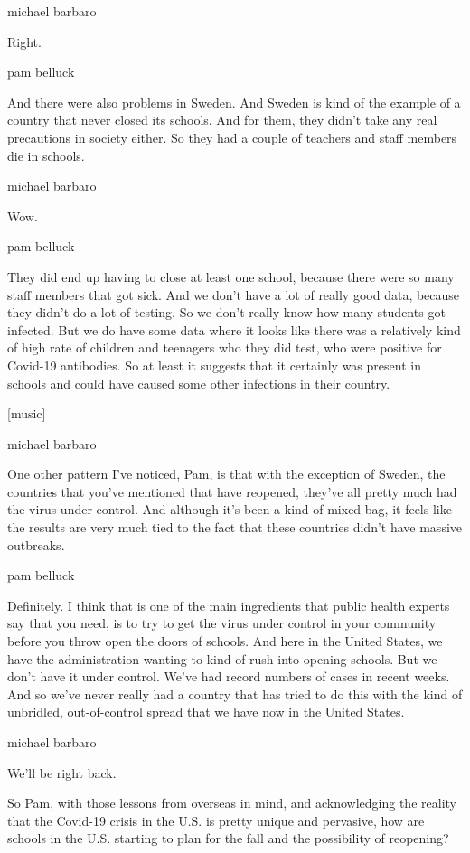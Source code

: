 michael barbaro

Right.

pam belluck

And there were also problems in Sweden. And Sweden is kind of the
example of a country that never closed its schools. And for them, they
didn't take any real precautions in society either. So they had a couple
of teachers and staff members die in schools.

michael barbaro

Wow.

pam belluck

They did end up having to close at least one school, because there were
so many staff members that got sick. And we don't have a lot of really
good data, because they didn't do a lot of testing. So we don't really
know how many students got infected. But we do have some data where it
looks like there was a relatively kind of high rate of children and
teenagers who they did test, who were positive for Covid-19 antibodies.
So at least it suggests that it certainly was present in schools and
could have caused some other infections in their country.

{[}music{]}

michael barbaro

One other pattern I've noticed, Pam, is that with the exception of
Sweden, the countries that you've mentioned that have reopened, they've
all pretty much had the virus under control. And although it's been a
kind of mixed bag, it feels like the results are very much tied to the
fact that these countries didn't have massive outbreaks.

pam belluck

Definitely. I think that is one of the main ingredients that public
health experts say that you need, is to try to get the virus under
control in your community before you throw open the doors of schools.
And here in the United States, we have the administration wanting to
kind of rush into opening schools. But we don't have it under control.
We've had record numbers of cases in recent weeks. And so we've never
really had a country that has tried to do this with the kind of
unbridled, out-of-control spread that we have now in the United States.

michael barbaro

We'll be right back.

So Pam, with those lessons from overseas in mind, and acknowledging the
reality that the Covid-19 crisis in the U.S. is pretty unique and
pervasive, how are schools in the U.S. starting to plan for the fall and
the possibility of reopening?

